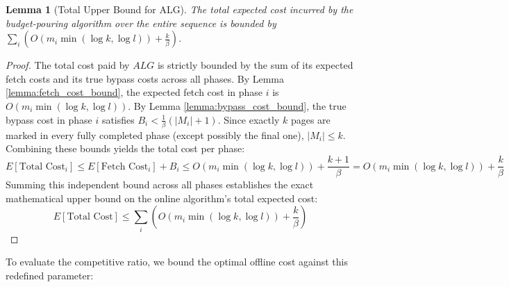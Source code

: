 \documentclass[a4paper]{article}
\newtheorem{lemma}{Lemma}      %
\begin{document}
\begin{lemma}[Total Upper Bound for ALG]
\label{lemma:alg_bypass_upper_bound}
The total expected cost incurred by the budget-pouring algorithm over the entire sequence is bounded by $\sum_i \left( O\left(m_i \min(\log k, \log l)\right) + \frac{k}{\beta} \right)$.
\end{lemma}
\begin{proof}
The total cost paid by $ALG$ is strictly bounded by the sum of its expected fetch costs and its true bypass costs across all phases. By Lemma \ref{lemma:fetch_cost_bound}, the expected fetch cost in phase $i$ is $O\left(m_i \min(\log k, \log l)\right)$. By Lemma \ref{lemma:bypass_cost_bound}, the true bypass cost in phase $i$ satisfies $B_i < \frac{1}{\beta}(|M_i| + 1)$. Since exactly $k$ pages are marked in every fully completed phase (except possibly the final one), $|M_i| \le k$. Combining these bounds yields the total cost per phase:
$$ E[\text{Total Cost}_i] \le E[\text{Fetch Cost}_i] + B_i \le O\left(m_i \min(\log k, \log l)\right) + \frac{k+1}{\beta} = O\left(m_i \min(\log k, \log l)\right) + \frac{k}{\beta} $$
Summing this independent bound across all phases establishes the exact mathematical upper bound on the online algorithm's total expected cost:
$$ E[\text{Total Cost}] \le \sum_i \left( O\left(m_i \min(\log k, \log l)\right) + \frac{k}{\beta} \right) $$
\end{proof}

To evaluate the competitive ratio, we bound the optimal offline cost against this redefined parameter:
\end{document}
